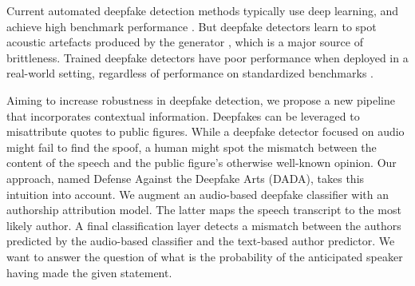 \documentclass{Interspeech}
\begin{document}

Current automated deepfake detection methods typically use deep learning, and
achieve high benchmark performance . But
deepfake detectors learn to spot acoustic artefacts produced by the generator
, which is a major source of brittleness. Trained
deepfake detectors have poor performance when deployed in a real-world setting,
regardless of performance on standardized benchmarks .

Aiming to increase robustness in deepfake detection, we propose a new pipeline
that incorporates contextual information. Deepfakes can be leveraged to
misattribute quotes to public figures. While a deepfake detector focused on
audio might fail to find the spoof, a human might spot the mismatch between the
content of the speech and the public figure's otherwise well-known opinion. Our
approach, named Defense Against the Deepfake Arts (DADA), takes this intuition
into account. We augment an audio-based deepfake classifier with an authorship
attribution model. The latter maps the speech transcript to the most likely
author. A final classification layer detects a mismatch between the authors
predicted by the audio-based classifier and the text-based author predictor. We
want to answer the question of what is the probability of the anticipated
speaker having made the given statement.

\end{document}
